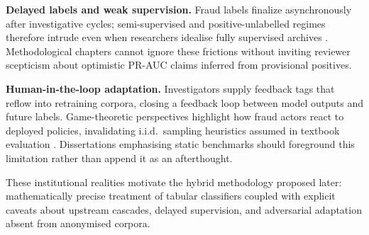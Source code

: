 \textbf{Delayed labels and weak supervision.} Fraud labels finalize asynchronously after investigative cycles; semi-supervised and positive-unlabelled regimes therefore intrude even when researchers idealise fully supervised archives \cite{yousefi_fraud_survey2019}. Methodological chapters cannot ignore these frictions without inviting reviewer scepticism about optimistic PR-AUC claims inferred from provisional positives.

\textbf{Human-in-the-loop adaptation.} Investigators supply feedback tags that reflow into retraining corpora, closing a feedback loop between model outputs and future labels. Game-theoretic perspectives highlight how fraud actors react to deployed policies, invalidating i.i.d.\ sampling heuristics assumed in textbook evaluation \cite{lucas_jurgovsky_ccfraud_survey2020}. Dissertations emphasising static benchmarks should foreground this limitation rather than append it as an afterthought.

These institutional realities motivate the hybrid methodology proposed later: mathematically precise treatment of tabular classifiers coupled with explicit caveats about upstream cascades, delayed supervision, and adversarial adaptation absent from anonymised corpora.